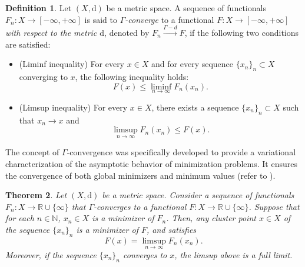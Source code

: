 \documentclass[a4paper, 11pt, reqno]{amsart}
\theoremstyle{plain}
\newtheorem{theorem}{Theorem}[section]
\theoremstyle{definition}
\newtheorem{definition}[theorem]{Definition}
\theoremstyle{remark}
\begin{document}
    \begin{definition}
        Let $(X, \mathrm{d})$ be a metric space. A sequence of functionals $F_n: X \to [-\infty, +\infty]$ is said to \emph{$\Gamma$-converge} to a functional $F: X \to [-\infty, +\infty]$ \emph{with respect to the metric $\mathrm{d}$}, denoted by $F_n \overset{\Gamma-d}{\longrightarrow} F$, if the following two conditions are satisfied:
        \begin{itemize}
            \item[(i)] (Liminf inequality) For every $x \in X$ and for every sequence $\{x_n\}_n \subset X$ converging to $x$, the following inequality holds:
            \[
                F(x) \leq \liminf_{n\to\infty} F_n(x_n).
            \]
            \item[(ii)] (Limsup inequality) For every $x \in X$, there exists a sequence $\{x_n\}_n \subset X$ such that $x_n \to x$ and
            \[
                \limsup_{n\to\infty} F_n(x_n) \leq F(x).
            \]
        \end{itemize}
    \end{definition}

    The concept of $\Gamma$-convergence was specifically developed to provide a variational characterization of the asymptotic behavior of minimization problems. It ensures the convergence of both global minimizers and minimum values (refer to \cite[Corollary 7.20]{Dalmasobook}).

    \begin{theorem}
        Let $(X, \mathrm{d})$ be a metric space. Consider a sequence of functionals $F_n: X \to \mathbb{R} \cup \{\infty\}$ that $\Gamma$-converges to a functional $F: X \to \mathbb{R} \cup \{\infty\}$.
        Suppose that for each $n \in \mathbb{N}$, $x_n \in X$ is a minimizer of $F_n$.
        Then, any cluster point $x \in X$ of the sequence $\{x_n\}_n$ is a minimizer of $F$, and satisfies
        \[
            F(x) = \limsup_{n\to\infty} F_n(x_n).
        \]
        Moreover, if the sequence $\{x_n\}_n$ converges to $x$, the limsup above is a full limit.
    \end{theorem}



\end{document}

